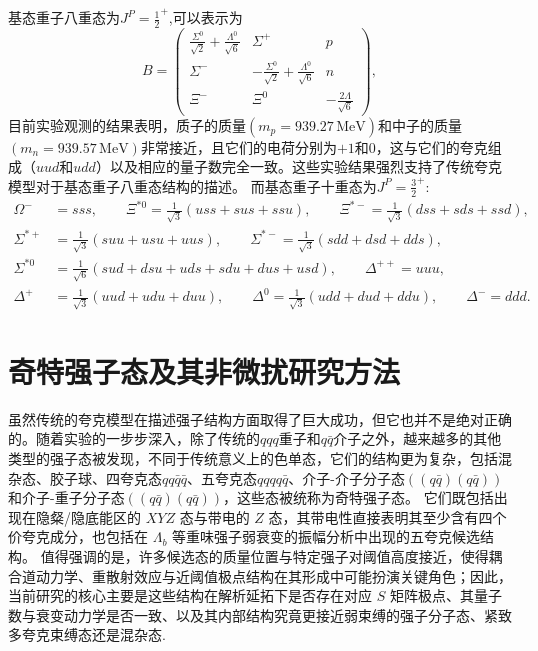 基态重子八重态为$J^P = \frac{1}{2}^+$,可以表示为
\begin{equation}
    B = \begin{pmatrix}
    \frac{\Sigma^0}{\sqrt{2}} + \frac{\Lambda^0}{\sqrt{6}} & \Sigma^+ & p \\
    \Sigma^- & -\frac{\Sigma^0}{\sqrt{2}} + \frac{\Lambda^0}{\sqrt{6}} & n \\
    \Xi^- & \Xi^0 & -\frac{2\Lambda}{\sqrt{6}}
    \end{pmatrix} ,
\end{equation}
目前实验观测的结果表明，质子的质量$(m_p=939.27\,\text{MeV})$和中子的质量$(m_n=939.57\,\text{MeV})$非常接近，且它们的电荷分别为$+1$和$0$，这与它们的夸克组成（$uud$和$udd$）以及相应的量子数完全一致。这些实验结果强烈支持了传统夸克模型对于基态重子八重态结构的描述。
而基态重子十重态为$J^P = \frac{3}{2}^+$:
\begin{equation}
\begin{aligned}
\Omega^- &= sss, \qquad 
\Xi^{*0} = \frac{1}{\sqrt{3}}\left(uss + sus + ssu\right), \qquad
\Xi^{*-} = \frac{1}{\sqrt{3}}\left(dss + sds + ssd\right), \\[6pt]
\Sigma^{*+} &= \frac{1}{\sqrt{3}}\left(suu + usu + uus\right), \qquad
\Sigma^{*-} = \frac{1}{\sqrt{3}}\left(sdd + dsd + dds\right), \\[6pt]
\Sigma^{*0} &= \frac{1}{\sqrt{6}}\left(sud + dsu + uds + sdu + dus + usd\right), 
\qquad
\Delta^{++} = uuu, \\[6pt]
\Delta^{+} &= \frac{1}{\sqrt{3}}\left(uud + udu + duu\right), \qquad
\Delta^{0} = \frac{1}{\sqrt{3}}\left(udd + dud + ddu\right), \qquad
\Delta^{-} = ddd .
\end{aligned}
\end{equation}


\section{奇特强子态及其非微扰研究方法}
虽然传统的夸克模型在描述强子结构方面取得了巨大成功，但它也并不是绝对正确的。随着实验的一步步深入，除了传统的$qqq$重子和$q\bar{q}$介子之外，越来越多的其他类型的强子态被发现，不同于传统意义上的色单态，它们的结构更为复杂，包括混杂态、胶子球、四夸克态$qq\bar{q}\bar{q}$、五夸克态$qqqq\bar{q}$、介子-介子分子态$((q\bar{q})(q\bar{q}))$和介子-重子分子态$((q\bar{q})(q\bar{q}))$，这些态被统称为奇特强子态。
它们既包括出现在隐粲/隐底能区的 $XYZ$ 态与带电的 $Z$ 态，其带电性直接表明其至少含有四个价夸克成分，也包括在 $\Lambda_b$ 等重味强子弱衰变的振幅分析中出现的五夸克候选结构。
值得强调的是，许多候选态的质量位置与特定强子对阈值高度接近，使得耦合道动力学、重散射效应与近阈值极点结构在其形成中可能扮演关键角色；因此，当前研究的核心主要是这些结构在解析延拓下是否存在对应 $S$ 矩阵极点、其量子数与衰变动力学是否一致、以及其内部结构究竟更接近弱束缚的强子分子态、紧致多夸克束缚态还是混杂态.\\

